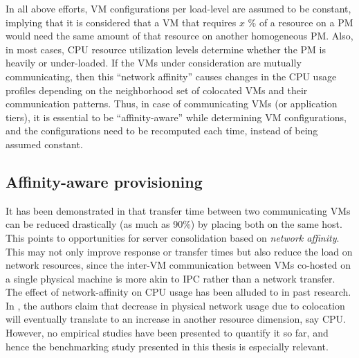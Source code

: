 In all above efforts, 
VM configurations per load-level are assumed 
to be constant, implying that 
it is considered that a VM that requires $x$ \% of a resource
on a PM would need the same amount of that resource on another
homogeneous PM. Also, in most cases, CPU resource utilization 
levels determine whether the PM is heavily or under-loaded.
If the VMs under consideration are
mutually communicating, then this ``network affinity'' causes changes
in the CPU usage profiles depending on the neighborhood set of
colocated VMs and their communication patterns. Thus, in case of 
communicating VMs (or application tiers), it is essential to be
``affinity-aware'' while determining VM configurations, and the configurations
need to be recomputed each time, instead of being assumed constant.

\subsection{Affinity-aware provisioning}
It has been demonstrated in \cite{virtual-putty} that
transfer time between two communicating VMs can be 
reduced drastically
(as much as 90\%) by placing both on the same host.
This points to opportunities for
server consolidation based on \textit{network affinity}. 
This may not only
improve response or transfer times but also reduce the load on network
resources, since the inter-VM communication between VMs co-hosted on a
single physical machine is more akin to IPC rather than a network transfer.
The effect of network-affinity on CPU usage has been 
alluded to in past research. In \cite{virtual-putty}, the authors
claim that decrease in physical network usage due to colocation will 
eventually translate to an increase in another resource dimension, say CPU.
However, no empirical studies have been presented to quantify it so far,
and hence the benchmarking study presented in this thesis is especially relevant.

